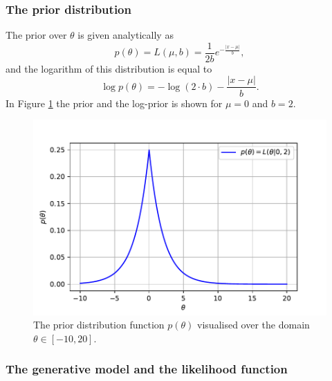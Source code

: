 \documentclass{article}
\begin{document}
\subsubsection{The prior distribution}
The prior over $\theta$ is given analytically as
\begin{equation}
p(\theta) = L(\mu, b) = \frac{1}{2b} e^{-\frac{\vert x - \mu \vert}{b}},
\end{equation}
and the logarithm of this distribution is equal to
\begin{equation}
\log p(\theta) = -\log ( 2\cdot b ) - \frac{\vert x - \mu \vert}{b}.
\end{equation}
In Figure \ref{fig:Q1a_prior} the prior and the log-prior is shown for $\mu = 0$ and $b = 2$. 
\begin{figure}[htb!]
\centering
\includegraphics[scale=0.6]{Q1a_2.pdf}
\caption{The prior distribution function $p(\theta)$ visualised over the domain $\theta \in [-10, 20]$.}
\label{fig:Q1a_prior}
\end{figure}


\subsubsection{The generative model and the likelihood function}
\end{document}
